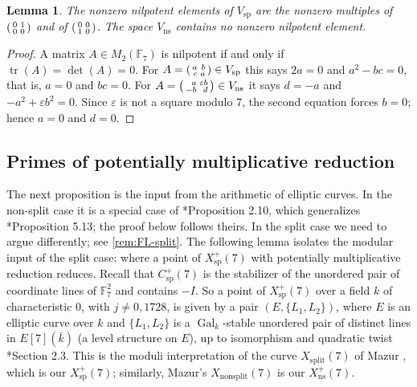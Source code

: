 \documentclass[12pt]{amsart}
\newcommand{\F}{{\mathbb F}}
\DeclareMathOperator{\ns}{ns}
\DeclareMathOperator{\spc}{sp}
\DeclareMathOperator{\Gal}{Gal}
\newcommand{\cdef}[1]{{\color{blue} \textsf{#1}}} %
\numberwithin{equation}{section}
\newtheorem{lemma}[theorem]{Lemma}
\theoremstyle{definition}
\begin{document}
\begin{lemma}
  \label{lem:nilpotents}
  The nonzero nilpotent elements of $V_{\spc}$ are the nonzero multiples of
  $\begin{psmallmatrix*}[r] 0 & 1 \\ 0 & 0\end{psmallmatrix*}$ and of
  $\begin{psmallmatrix*}[r] 0 & 0 \\ 1 & 0\end{psmallmatrix*}$. The space $V_{\ns}$
  contains no nonzero nilpotent element.
\end{lemma}
\begin{proof}
  A matrix $A \in M_2(\F_7)$ is nilpotent if and only if $\operatorname{tr}(A) =
  \det(A) = 0$. For $A = \begin{psmallmatrix*}[r] a & b \\ c & a\end{psmallmatrix*}
  \in V_{\spc}$ this says $2a = 0$ and $a^2 - bc = 0$, that is, $a = 0$ and $bc
  = 0$. For $A = \begin{psmallmatrix*}[r] a & \varepsilon b \\ -b &
  d\end{psmallmatrix*} \in V_{\ns}$ it says $d = -a$ and $-a^2 + \varepsilon b^2
  = 0$. Since $\varepsilon$ is not a square modulo $7$, the second equation
  forces $b = 0$; hence $a = 0$ and $d = 0$.
\end{proof}

\subsection{Primes of potentially multiplicative reduction}
The next proposition is the input from the arithmetic of elliptic curves. In the
non-split case it is a special case of \cite{Furio--Lombardo26}*{Proposition 2.10}, which
generalizes \cite{Furio-24}*{Proposition 5.13}; the proof below follows theirs.
In the split case we need to argue differently; see \cref{rem:FL-split}. The
following lemma isolates the modular input of the split case: where a point of
$X_{\spc}^{+}(7)$ with potentially multiplicative reduction reduces. Recall
that $C_{\spc}^{+}(7)$ is the stabilizer of the unordered pair of coordinate
lines of $\F_7^{2}$ and contains $-I$. So a point of $X_{\spc}^{+}(7)$ over a
field $k$ of characteristic $0$, with $j \neq 0, 1728$, is given by a pair
$(E,\{L_1,L_2\})$, where $E$ is an elliptic curve over $k$ and $\{L_1,L_2\}$ is
a $\Gal_k$-stable unordered pair of distinct lines in $E[7](\bar k)$ (a
\cdef{level structure} on $E$), up to isomorphism and quadratic twist \cite{RSZB-22}*{Section 2.3}. This is the
moduli interpretation of the curve $X_{\mathrm{split}}(7)$ of Mazur
\cite{Mazur-77}, which is our $X_{\spc}^{+}(7)$; similarly, Mazur's
$X_{\mathrm{nonsplit}}(7)$ is our $X_{\ns}^{+}(7)$.
\end{document}
